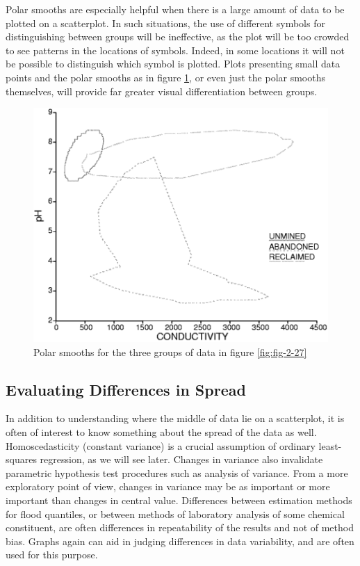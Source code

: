 \documentclass[]{book}
\begin{document}
Polar smooths are especially helpful when there is a large amount of data to be plotted on a scatterplot. In such situations, the use of different symbols for distinguishing between groups will be ineffective, as the plot will be too crowded to see patterns in the locations of symbols. Indeed, in some locations it will not be possible to distinguish which symbol is plotted. Plots presenting small data points and the polar smooths as in figure \ref{fig:fig-2-28}, or even just the polar smooths themselves, will provide far greater visual differentiation between groups.

\begin{figure}

{\centering \includegraphics[width=12.36in]{figures/2_28} 

}

\caption{Polar smooths for the three groups of data in figure \ref{fig:fig-2-27}}\label{fig:fig-2-28}
\end{figure}

\hypertarget{evaluating-differences-in-spread}{%
\subsection{Evaluating Differences in Spread}\label{evaluating-differences-in-spread}}

In addition to understanding where the middle of data lie on a scatterplot, it is often of interest to know something about the spread of the data as well. Homoscedasticity (constant variance) is a crucial assumption of ordinary least-squares regression, as we will see later. Changes in variance also invalidate parametric hypothesis test procedures such as analysis of variance. From a more exploratory point of view, changes in variance may be as important or more important than changes in central value. Differences between estimation methods for flood quantiles, or between methods of laboratory analysis of some chemical constituent, are often differences in repeatability of the results and not of method bias. Graphs again can aid in judging differences in data variability, and are often used for this purpose.
\end{document}
